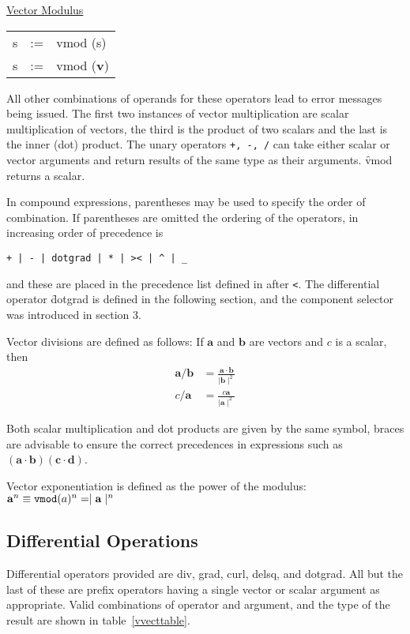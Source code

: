 \underline{Vector Modulus}\\
 
\begin{tabular}{rcl}
   s    &:=& vmod (s)\\
   s    &:=& vmod (\textbf{v})
\end{tabular}

All other combinations of operands for these operators lead to error
messages being issued.  The first two instances of vector
multiplication are scalar multiplication of vectors, the third is the
 
 
product of two scalars and the last is the inner (dot) product.  The
unary operators  \texttt{+, -, /} can take either scalar or vector
arguments and return results of the same type as their arguments.
\f{vmod} returns a scalar.

In compound expressions, parentheses may be used to specify the order of
combination.  If parentheses are omitted the ordering of the
operators, in increasing order of precedence is
\begin{verbatim}
+ | - | dotgrad | * | >< | ^ | _
\end{verbatim}
and these are placed in the precedence list defined in \REDUCE
after \texttt{<}.
The differential operator \f{dotgrad} is defined in the 
\hypertarget{operator:DORGRAD}{}
following section, and the component selector \texttt{\textunderscore} was introduced in
section 3.

Vector divisions are defined as follows:  If $\mathbf{a}$ and $\mathbf{b}$ are
vectors and $c$ is a scalar, then
\begin{align*}
\mathbf{a} /  \mathbf{b} & =   \frac{\mathbf{a} \cdot \mathbf{b}}{  \mid \mathbf{b}
\mid^2}\\
c / \mathbf{a}   & =   \frac{c \mathbf{a}  }{ \mid \mathbf{a} \mid^2}
\end{align*}

Both scalar multiplication and dot products are given by the same symbol,
braces are advisable to ensure the correct
precedences in expressions such as $(\mathbf{a} \cdot \mathbf{b})
(\mathbf{c} \cdot \mathbf{d})$.

Vector exponentiation is defined as the power of the modulus:\\
$\mathbf{a}^n \equiv  \texttt{vmod}(a)^n =   \mid \mathbf{a} \mid^n$

\subsection{Differential Operations}
Differential operators provided are div, grad, curl, delsq, and dotgrad.
 
 
\hypertarget{operator:DOTGRAD}{}
All but the last of these are prefix operators having a single
vector or scalar argument as appropriate.  Valid combinations of
operator and argument, and the type of the result are shown in table~\ref{vvecttable}.


